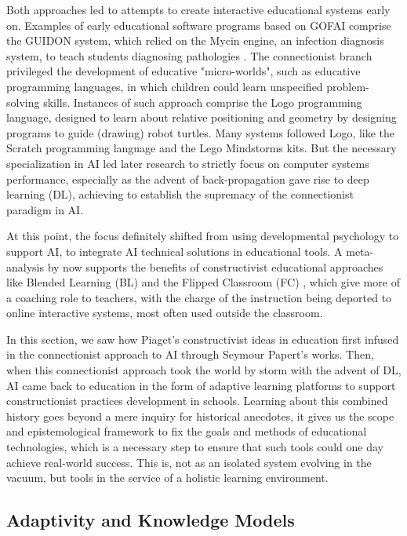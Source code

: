 Both approaches led to attempts to create interactive educational systems early on. Examples of early educational software programs based on GOFAI comprise the GUIDON system, which relied on the Mycin engine, an infection diagnosis system, to teach students diagnosing pathologies \parencite{william_j_guidon_1983}. The connectionist branch privileged the development of educative "micro-worlds", such as educative programming languages, in which children could learn unspecified problem-solving skills. Instances of such approach comprise the Logo programming language, designed to learn about relative positioning and geometry by designing programs to guide (drawing) robot turtles. Many systems followed Logo, like the Scratch programming language and the Lego Mindstorms kits. But the necessary specialization in AI led later research to strictly focus on computer systems performance, especially as the advent of back-propagation gave rise to deep learning (DL), achieving to establish the supremacy of the connectionist paradigm in AI.

At this point, the focus definitely shifted from using developmental psychology to support AI, to integrate AI technical solutions in educational tools. A meta-analysis by \textcite{schmid_meta-analysis_2023} now supports the benefits of constructivist educational approaches like Blended Learning (BL)  and the Flipped Classroom (FC) , which give more of a coaching role to teachers, with the charge of the instruction being deported to online interactive systems, most often used outside the classroom.

In this section, we saw how Piaget's constructivist ideas in education first infused in the connectionist approach to AI through Seymour Papert's works. Then, when this connectionist approach took the world by storm with the advent of DL, AI came back to education in the form of adaptive learning platforms to support constructionist practices development in schools. Learning about this combined history goes beyond a mere inquiry for historical anecdotes, it gives us the scope and epistemological framework to fix the goals and methods of educational technologies, which is a necessary step to ensure that such tools could one day achieve real-world success. This is, not as an isolated system evolving in the vacuum, but tools in the service of a holistic learning environment.
    
    \subsection{Adaptivity and Knowledge Models}
